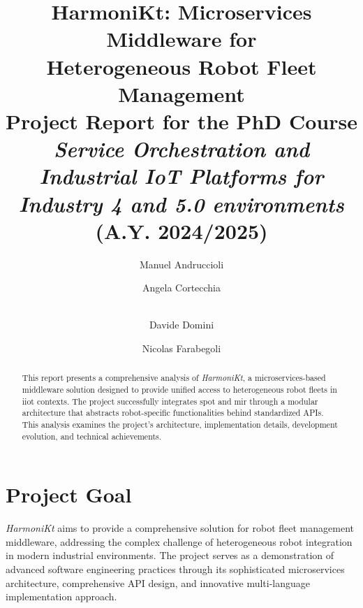 \documentclass[runningheads]{llncs}
\newcommand{\thesystem}{\textit{HarmoniKt}\xspace}
\begin{document}
%
\title{HarmoniKt: Microservices Middleware for\\Heterogeneous Robot Fleet Management\\
\small\textnormal{
    Project Report for the PhD Course \emph{Service Orchestration and Industrial IoT Platforms for Industry 4 and 5.0 environments} (A.Y. 2024/2025)
}
}
%
%
\author{
Manuel Andruccioli \and
Angela Cortecchia \and
\\
Davide Domini \and
Nicolas Farabegoli
}
%
%
%
\maketitle              %
%
\begin{abstract}
This report presents a comprehensive analysis of \thesystem, a microservices-based middleware solution designed to provide unified access to heterogeneous robot fleets in \ac{iiot} contexts. The project successfully integrates \ac{spot} and \ac{mir} through a modular architecture that abstracts robot-specific functionalities behind standardized APIs. This analysis examines the project's architecture, implementation details, development evolution, and technical achievements.

\end{abstract}
%
%
%
\section{Project Goal}

\thesystem aims to provide a comprehensive solution for robot fleet management middleware, addressing the complex challenge of heterogeneous robot integration in modern industrial environments. The project serves as a demonstration of advanced software engineering practices through its sophisticated microservices architecture, comprehensive API design, and innovative multi-language implementation approach.
\end{document}
